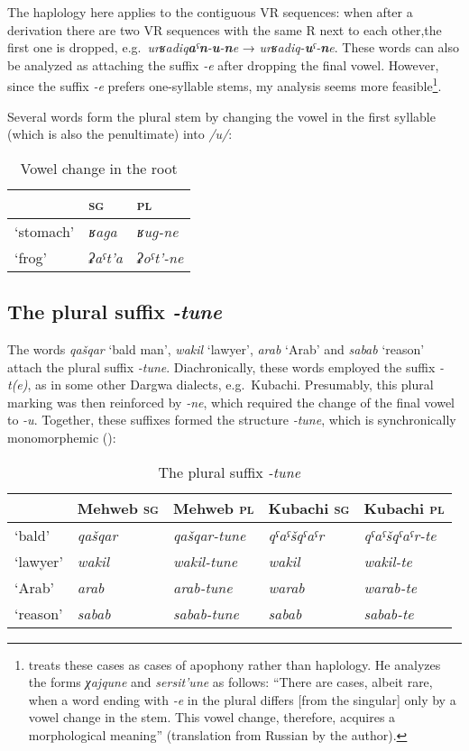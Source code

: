 ﻿\documentclass[output=paper]{langsci/langscibook}
\begin{document}
The haplology here applies to the contiguous VR sequences: when after a
derivation there are two VR sequences with the same R next to each other,\pagebreak[4]
the first one is dropped, e.g.\
\emph{urʁadiq\textbf{a}ˤ\textbf{n}-\textbf{u}-\textbf{n}e} →
\emph{urʁadiq-\textbf{u}ˤ-\textbf{n}e}. These words can also be analyzed
as attaching the suffix \emph{-e} after dropping the final vowel.
However, since the suffix \emph{-e} prefers one-syllable stems, my
analysis seems more feasible\footnote{\citet[36]{magometov1982} treats these
  cases as cases of apophony rather than haplology. He analyzes the forms
  \emph{χajqune} and \emph{sersit'une} as follows: ``There are cases,
  albeit rare, when a word ending with \emph{-e} in the
  plural differs [from the singular] only by a vowel change in the stem.
  This vowel change, therefore, acquires a morphological meaning'' (translation from Russian by the author).}.

Several words form the plural stem by changing the vowel in the first
syllable (which is also the penultimate) into \emph{/u/}:

\begin{table}[h]
  \caption{Vowel change in the root}
\begin{tabular}{@{}lll@{}}
\toprule
& \textsc{sg} & \textsc{pl}\tabularnewline \midrule
`stomach' & \emph{ʁaga} & \emph{ʁug-ne}\tabularnewline
`frog' & \emph{ʡaˤt'a} & \emph{ʡoˤt'-ne}\tabularnewline
\bottomrule
\end{tabular}
\end{table}

\subsection{The plural suffix \emph{-tune}}
\label{the-plural-suffix--tune}

The words \emph{qašqar} `bald man', \emph{wakil} `lawyer', \emph{arab}
`Arab' and \emph{sabab} `reason' attach the plural suffix \emph{-tune}.
Diachronically, these words employed the suffix \emph{-t(e)}, as in some
other Dargwa dialects, e.g.\ Kubachi. Presumably, this plural marking was
then reinforced by \emph{-ne}, which required the change of the final
vowel to \mbox{\emph{-u}}. Together, these suffixes formed the structure
\emph{-tune}, which is synchronically monomorphemic (\tabref{tab:3:12}):

\begin{table}[h]
  \caption{The plural suffix \emph{-tune}}\label{tab:3:12}
  
\begin{tabular}{@{}lllll@{}}
\toprule
& {Mehweb \textsc{sg}} & {Mehweb \textsc{pl}} & {Kubachi \textsc{sg}} & {Kubachi \textsc{pl}}\tabularnewline \midrule
`bald' & \emph{qašqar} & \emph{qašqar-tune} & \emph{qˤaˤšqˤaˤr} &
\emph{qˤaˤšqˤaˤr-te}\tabularnewline
`lawyer' & \emph{wakil} & \emph{wakil-tune} & \emph{wakil} &
\emph{wakil-te}\tabularnewline
`Arab' & \emph{arab} & \emph{arab-tune} & \emph{warab} &
\emph{warab-te}\tabularnewline
`reason' & \emph{sabab} & \emph{sabab-tune} & \emph{sabab} &
\emph{sabab-te}\tabularnewline
\bottomrule
\end{tabular}
\end{table}
\end{document}
